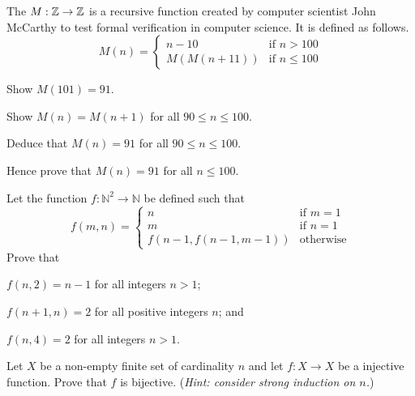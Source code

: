 \begin{problem}
    The  $M: \mathbb{Z} \to \mathbb{Z}$ is a recursive function created by computer scientist John McCarthy to test formal verification in computer science. It is defined as follows.
    \[
        M(n) = \begin{cases}
            n - 10 & \text{if } n > 100\\
            M(M(n+11)) & \text{if } n \leq 100
        \end{cases}
    \]
    \begin{partquestions}{\roman*}
        \item Show $M(101) = 91$.
        \item Show $M(n) = M(n+1)$ for all $90 \leq n \leq 100$.
        \item Deduce that $M(n) = 91$ for all $90 \leq n \leq 100$.
        \item Hence prove that $M(n) = 91$ for all $n \leq 100$.
    \end{partquestions}
\end{problem}

\begin{problem}
    Let the function $f: \mathbb{N}^2 \to \mathbb{N}$ be defined such that
    \[
        f(m, n) =
        \begin{cases}
            n & \text{if } m = 1 \\
            m & \text{if } n = 1 \\
            f\left(n-1,f(n-1,m-1)\right) & \text{otherwise}
        \end{cases}
    \]
    Prove that
    \begin{partquestions}{\roman*}
        \item $f(n,2) = n - 1$ for all integers $n > 1$;
        \item $f(n+1, n) = 2$ for all positive integers $n$; and
        \item $f(n, 4) = 2$ for all integers $n > 1$.
    \end{partquestions}
\end{problem}

\begin{problem}\label{problem-injection-from-finite-set-to-itself-is-bijection}
    Let $X$ be a non-empty finite set of cardinality $n$ and let $f: X \to X$ be a injective function. Prove that $f$ is bijective.\newline
    (\textit{Hint: consider strong induction on $n$.})
\end{problem}
